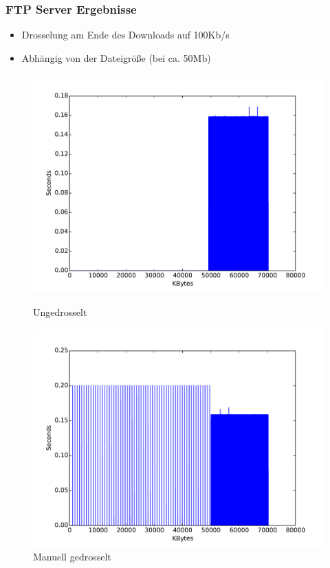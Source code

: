 \documentclass[handout]{beamer}
\begin{document}
\begin{frame}
\frametitle{FTP Server Ergebnisse}
\begin{itemize}
\item Drosselung am Ende des Downloads auf 100Kb/s
\item Abhängig von der Dateigröße (bei ca. 50Mb)
\end{itemize}
\begin{figure}
\centering
\begin{minipage}[t]{0.49\linewidth}
			\centering
			\includegraphics[width=\linewidth]{images/seconds_ftp_cip-unthrottled.pdf}
			\caption{Ungedrosselt}
\end{minipage}
\begin{minipage}[t]{0.49\linewidth}
			\centering
			\includegraphics[width=\linewidth]{images/seconds_ftp_cip-throttled.pdf}
			\caption{Manuell gedrosselt}
\end{minipage}
\end{figure}
\end{frame}
\end{document}
